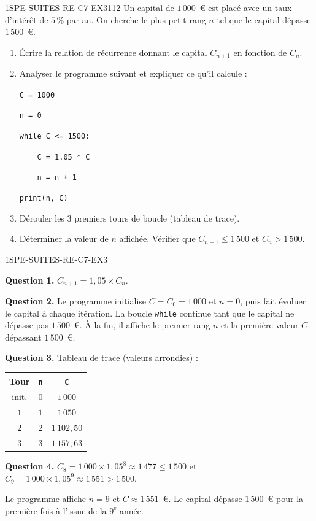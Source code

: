 \begin{exercice}{1SPE-SUITES-RE-C7-EX3}{1}{12}
Un capital de $1\,000$~€ est placé avec un taux d'intérêt de $5\,\%$ par an. On cherche le plus petit rang $n$ tel que le capital dépasse $1\,500$~€.
\begin{enumerate}
  \item Écrire la relation de récurrence donnant le capital $C_{n+1}$ en fonction de $C_n$.
  \item Analyser le programme suivant et expliquer ce qu'il calcule :

\medskip
\verb|C = 1000|

\verb|n = 0|

\verb|while C <= 1500:|

\verb|    C = 1.05 * C|

\verb|    n = n + 1|

\verb|print(n, C)|

  \item Dérouler les $3$ premiers tours de boucle (tableau de trace).
  \item Déterminer la valeur de $n$ affichée. Vérifier que $C_{n-1} \leq 1\,500$ et $C_n > 1\,500$.
\end{enumerate}
\end{exercice}


\begin{corrige}{1SPE-SUITES-RE-C7-EX3}

\textbf{Question 1.} $C_{n+1} = 1{,}05 \times C_n$.

\textbf{Question 2.} Le programme initialise $C = C_0 = 1\,000$ et $n = 0$, puis fait évoluer le capital à chaque itération. La boucle \texttt{while} continue tant que le capital ne dépasse pas $1\,500$~€. À la fin, il affiche le premier rang $n$ et la première valeur $C$ dépassant $1\,500$~€.

\textbf{Question 3.} Tableau de trace (valeurs arrondies) :

\begin{center}
\begin{tabular}{|c|c|c|}
\hline
Tour & \texttt{n} & \texttt{C} \\
\hline
init. & $0$ & $1\,000$ \\
$1$ & $1$ & $1\,050$ \\
$2$ & $2$ & $1\,102{,}50$ \\
$3$ & $3$ & $1\,157{,}63$ \\
\hline
\end{tabular}
\end{center}

\textbf{Question 4.} $C_8 = 1\,000 \times 1{,}05^8 \approx 1\,477 \leq 1\,500$ et $C_9 = 1\,000 \times 1{,}05^9 \approx 1\,551 > 1\,500$.

Le programme affiche $n = 9$ et $C \approx 1\,551$~€. Le capital dépasse $1\,500$~€ pour la première fois à l'issue de la $9^{\text{e}}$ année.

\end{corrige}

